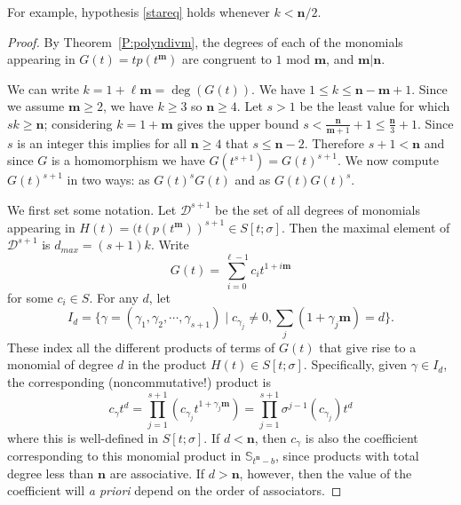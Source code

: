 \documentclass[11pt]{amsart}
\theoremstyle{plain}
\theoremstyle{definition}
\numberwithin{equation}{section}
\numberwithin{figure}{section}
\newcommand{\Sone}[1]{\Stsigma/\Stsigma (t^{\de}-#1)} %
\newcommand{\ring}{S}
\newcommand{\Stsigma}{S[t;\sigma]}
\newcommand{\os}{\mathbf{m}}  %
\newcommand{\de}{\mathbf{n}}  %
\begin{document}
For example, hypothesis \eqref{stareq} holds whenever $k<\de/2$.



\begin{proof}
By Theorem~\ref{P:polyndivm}, the degrees of each of the monomials appearing in $G(t)=tp(t^{\os})$ are congruent to $1$ mod $\os$, and $\os|\de$.

We can write  $k=1+\ell \os =\deg(G(t))$.  We have $1\leq k \leq \de-\os+1$.  Since we assume $\os\geq 2$, we have $k\geq 3$ so  $\de\geq 4$.  Let $s>1$ be the least value for which $sk\geq \de$; considering $k=1+\os$ gives the upper bound  $s<\frac{\de}{\os+1}+1\leq \frac{\de}{3}+1$.  Since $s$ is an integer this implies for all $\de\geq 4$ that $s \leq \de-2$.  Therefore  $s+1<\de$ and since $G$ is a homomorphism we have $G(t^{s+1})=G(t)^{s+1}$.    We now compute $G(t)^{s+1}$ in two ways:  as $G(t)^sG(t)$ and as $G(t)G(t)^s$.


We first set some notation.  Let $\mathcal{D}^{s+1}$ be the set of all degrees of monomials appearing in $H(t)=(t(p(t^{\os}))^{s+1}\in \Stsigma$.  Then the maximal element of $\mathcal{D}^{s+1}$ is $d_{max}=(s+1)k$.
Write
$$
G(t) = \sum_{i=0}^{\ell-1}c_it^{1+i\os}
$$
for some $c_i\in \ring$.  For any $d$, let
$$
I_{d} = \{\gamma = (\gamma_1,\gamma_2,\cdots,\gamma_{s+1})\mid c_{\gamma_j}\neq 0, \sum_j (1+\gamma_j \os) = d\}.
$$
These index all the different products of terms of $G(t)$ that give rise to a monomial of degree $d$ in the product $H(t)\in \Stsigma$.  Specifically, given $\gamma\in I_{d}$, the corresponding (noncommutative!) product
is
$$
c_\gamma t^d = \prod_{j=1}^{s+1} (c_{\gamma_j}t^{1+\gamma_j \os}) = \prod_{j=1}^{s+1} \sigma^{j-1}(c_{\gamma_j})t^d
$$
where this is well-defined in $\Stsigma$. If $d<\de$, then $c_\gamma$ is also the coefficient corresponding to this monomial product in $\mathbb{S}_{t^\de-b}$, %
since products with total degree less than $\de$ are associative.  If $d>\de$, however, then the value of the coefficient will \emph{a priori} depend on the order of associators.


\end{proof}
\end{document}
